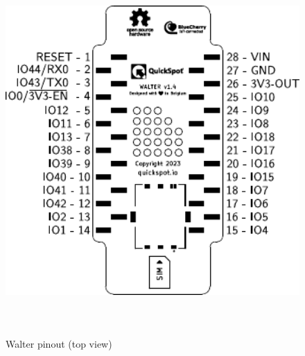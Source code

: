 \documentclass[11pt]{article}
\begin{document}
\begin{figure}[h]
    \centering
    \includegraphics[height=14cm]{walter-pinout-topview.pdf}
    \caption{Walter pinout (top view)}
    \label{fig:walter_pin_assignment}
\end{figure}
\newpage
\end{document}

